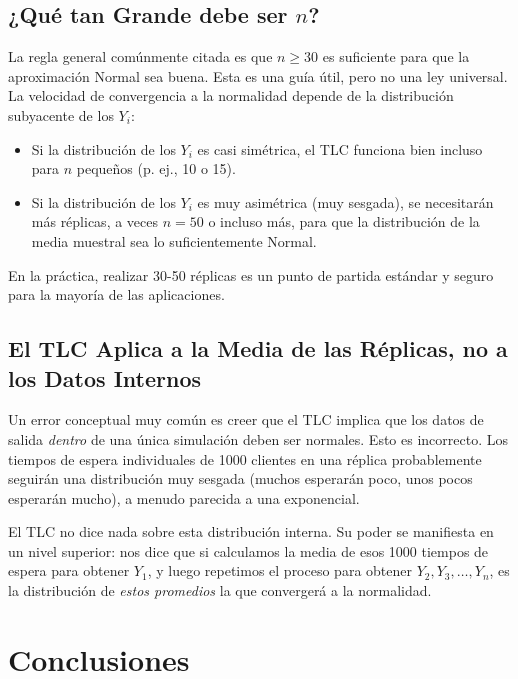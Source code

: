 \documentclass[11pt, letterpaper]{article}
\begin{document}
\subsection{¿Qué tan Grande debe ser $n$?}
La regla general comúnmente citada es que $n \ge 30$ es suficiente para que la aproximación Normal sea buena. Esta es una guía útil, pero no una ley universal. La velocidad de convergencia a la normalidad depende de la distribución subyacente de los $Y_i$:
\begin{itemize}
    \item Si la distribución de los $Y_i$ es casi simétrica, el TLC funciona bien incluso para $n$ pequeños (p. ej., 10 o 15).
    \item Si la distribución de los $Y_i$ es muy asimétrica (muy sesgada), se necesitarán más réplicas, a veces $n=50$ o incluso más, para que la distribución de la media muestral sea lo suficientemente Normal.
\end{itemize}
En la práctica, realizar 30-50 réplicas es un punto de partida estándar y seguro para la mayoría de las aplicaciones.

\subsection{El TLC Aplica a la Media de las Réplicas, no a los Datos Internos}
Un error conceptual muy común es creer que el TLC implica que los datos de salida \textit{dentro} de una única simulación deben ser normales. Esto es incorrecto. Los tiempos de espera individuales de 1000 clientes en una réplica probablemente seguirán una distribución muy sesgada (muchos esperarán poco, unos pocos esperarán mucho), a menudo parecida a una exponencial.

El TLC no dice nada sobre esta distribución interna. Su poder se manifiesta en un nivel superior: nos dice que si calculamos la media de esos 1000 tiempos de espera para obtener $Y_1$, y luego repetimos el proceso para obtener $Y_2, Y_3, \dots, Y_n$, es la distribución de \textit{estos promedios} la que convergerá a la normalidad.

\section{Conclusiones}
\end{document}
